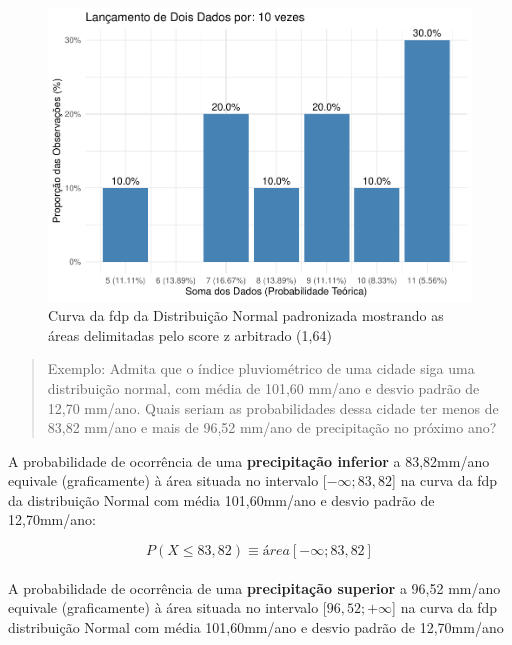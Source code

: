 \documentclass[
]{book}
\begin{document}
\begin{figure}[H]

{\centering \includegraphics{apostila_files/figure-latex/unnamed-chunk-82-1} 

}

\caption{Curva da fdp da Distribuição Normal padronizada mostrando as áreas delimitadas pelo score z arbitrado (1,64)}\label{fig:unnamed-chunk-82}
\end{figure}

\hfill\break

\begin{quote}
Exemplo: Admita que o índice pluviométrico de uma cidade siga uma distribuição normal, com média de 101,60 mm/ano e desvio padrão de 12,70 mm/ano. Quais seriam as probabilidades dessa cidade ter menos de 83,82 mm/ano e mais de 96,52 mm/ano de precipitação no próximo ano?
\end{quote}

\hfill\break

A probabilidade de ocorrência de uma \textbf{precipitação inferior} a 83,82mm/ano equivale (graficamente) à área situada no intervalo {[}\(-\infty ; 83,82\){]} na curva da fdp da distribuição Normal com média 101,60mm/ano e desvio padrão de 12,70mm/ano:

\hfill\break

\[
P(X \le 83,82) \equiv área[-\infty ; 83,82]
\]\\

A probabilidade de ocorrência de uma \textbf{precipitação superior} a 96,52 mm/ano equivale (graficamente) à área situada no intervalo {[}\(96,52 ; +\infty\){]} na curva da fdp distribuição Normal com média 101,60mm/ano e desvio padrão de 12,70mm/ano
\end{document}
